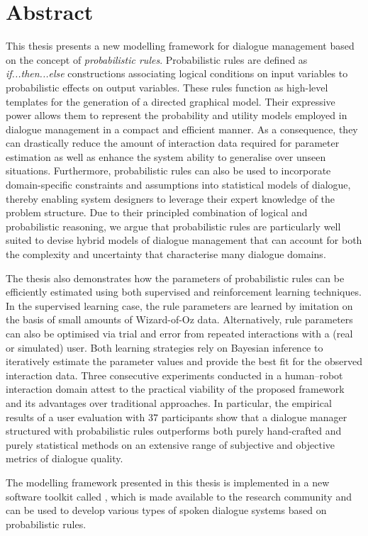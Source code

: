 \chapter*{Abstract}

This thesis presents a new modelling framework for dialogue management based on the concept of \textit{probabilistic rules}.  Probabilistic rules are defined as \textit{if...then...else} constructions associating logical conditions on input variables to probabilistic effects on output variables.  These rules function as high-level templates for the generation of a directed graphical model. Their expressive power allows them to represent the probability and utility models employed in dialogue management in a compact and efficient manner. As a consequence, they can drastically reduce the amount of interaction data required for parameter estimation as well as enhance the system ability to generalise over unseen situations. Furthermore, probabilistic rules can also be used to incorporate domain-specific constraints and assumptions into statistical models of dialogue, thereby enabling system designers to leverage their expert knowledge of the problem structure.  Due to their principled combination  of logical and probabilistic reasoning, we argue that probabilistic rules are particularly well suited to devise hybrid models of dialogue management that can account for both the complexity and uncertainty that characterise many dialogue domains.


The thesis also demonstrates how the parameters of probabilistic rules can be efficiently estimated using both supervised and reinforcement learning techniques. In the supervised learning case, the rule parameters are learned by imitation on the basis of small amounts of Wizard-of-Oz data.  Alternatively, rule parameters can also be optimised via trial and error from repeated interactions with a (real or simulated) 
user. Both learning strategies rely on Bayesian inference to iteratively estimate the parameter values and provide the best fit for the observed interaction data. Three consecutive experiments conducted in a human--robot interaction domain attest to the practical viability of the proposed framework and its advantages over traditional approaches.  In particular, the empirical results of a user evaluation with 37 participants show that a dialogue manager structured with probabilistic rules outperforms both purely hand-crafted and purely statistical methods on an extensive range of subjective and objective metrics of dialogue quality.

The modelling framework presented in this thesis is implemented in a new software toolkit called \opendial{}, which is made available to the research community and can be used to develop various types of spoken dialogue systems based on probabilistic rules. 
